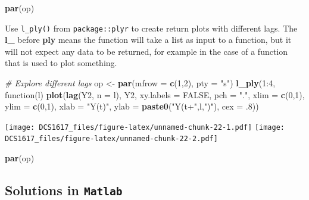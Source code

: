\documentclass[]{book}
\newenvironment{Shaded}{\begin{snugshade}}{\end{snugshade}}
\newcommand{\KeywordTok}[1]{\textcolor[rgb]{0.13,0.29,0.53}{\textbf{{#1}}}}
\newcommand{\DataTypeTok}[1]{\textcolor[rgb]{0.13,0.29,0.53}{{#1}}}
\newcommand{\DecValTok}[1]{\textcolor[rgb]{0.00,0.00,0.81}{{#1}}}
\newcommand{\StringTok}[1]{\textcolor[rgb]{0.31,0.60,0.02}{{#1}}}
\newcommand{\CommentTok}[1]{\textcolor[rgb]{0.56,0.35,0.01}{\textit{{#1}}}}
\newcommand{\OtherTok}[1]{\textcolor[rgb]{0.56,0.35,0.01}{{#1}}}
\newcommand{\NormalTok}[1]{{#1}}
\begin{document}
\begin{Shaded}
\begin{Highlighting}[]
\KeywordTok{par}\NormalTok{(op)}
\end{Highlighting}
\end{Shaded}

Use \texttt{l\_ply()} from \texttt{package::plyr} to create return plots
with different lags. The \textbf{l\_} before \textbf{ply} means the
function will take a \textbf{l}ist as input to a function, but it will
not expect any data to be returned, for example in the case of a
function that is used to plot something.

\begin{Shaded}
\begin{Highlighting}[]
\CommentTok{# Explore different lags}
\NormalTok{op <-}\StringTok{ }\KeywordTok{par}\NormalTok{(}\DataTypeTok{mfrow =} \KeywordTok{c}\NormalTok{(}\DecValTok{1}\NormalTok{,}\DecValTok{2}\NormalTok{), }\DataTypeTok{pty =} \StringTok{"s"}\NormalTok{)}
\KeywordTok{l_ply}\NormalTok{(}\DecValTok{1}\NormalTok{:}\DecValTok{4}\NormalTok{, function(l) }\KeywordTok{plot}\NormalTok{(}\KeywordTok{lag}\NormalTok{(Y2, }\DataTypeTok{n =} \NormalTok{l), Y2, }\DataTypeTok{xy.labels =} \OtherTok{FALSE}\NormalTok{, }\DataTypeTok{pch =} \StringTok{"."}\NormalTok{, }\DataTypeTok{xlim =} \KeywordTok{c}\NormalTok{(}\DecValTok{0}\NormalTok{,}\DecValTok{1}\NormalTok{), }\DataTypeTok{ylim =} \KeywordTok{c}\NormalTok{(}\DecValTok{0}\NormalTok{,}\DecValTok{1}\NormalTok{), }\DataTypeTok{xlab =} \StringTok{"Y(t)"}\NormalTok{, }\DataTypeTok{ylab =} \KeywordTok{paste0}\NormalTok{(}\StringTok{"Y(t+"}\NormalTok{,l,}\StringTok{")"}\NormalTok{), }\DataTypeTok{cex =} \NormalTok{.}\DecValTok{8}\NormalTok{))}
\end{Highlighting}
\end{Shaded}

\texttt{[image: DCS1617\_files/figure-latex/unnamed-chunk-22-1.pdf]}
\texttt{[image: DCS1617\_files/figure-latex/unnamed-chunk-22-2.pdf]}

\begin{Shaded}
\begin{Highlighting}[]
\KeywordTok{par}\NormalTok{(op)}
\end{Highlighting}
\end{Shaded}

\subsection{\texorpdfstring{Solutions in
\texttt{Matlab}}{Solutions in Matlab}}\label{solutions-in-matlab}
\end{document}
